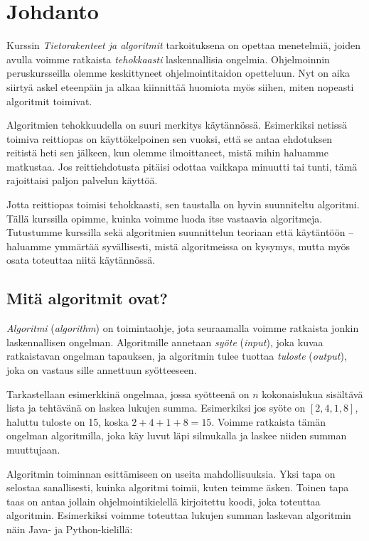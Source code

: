 \chapter{Johdanto}

Kurssin \emph{Tietorakenteet ja algoritmit} tarkoituksena
on opettaa menetelmiä, joiden avulla voimme ratkaista
\emph{tehokkaasti} laskennallisia ongelmia.
Ohjelmoinnin peruskursseilla olemme keskittyneet
ohjelmointitaidon opetteluun.
Nyt on aika siirtyä askel eteenpäin ja alkaa kiinnittää
huomiota myös siihen, miten nopeasti algoritmit toimivat.

Algoritmien tehokkuudella on suuri merkitys käytännössä.
Esimerkiksi netissä toimiva reittiopas on käyttökelpoinen sen vuoksi,
että se antaa ehdotuksen reitistä heti sen jälkeen, kun olemme
ilmoittaneet, mistä mihin haluamme matkustaa.
Jos reittiehdotusta pitäisi odottaa vaikkapa minuutti tai tunti,
tämä rajoittaisi paljon palvelun käyttöä.

Jotta reittiopas toimisi tehokkaasti, sen taustalla on
hyvin suunniteltu algoritmi.
Tällä kurssilla opimme, kuinka voimme luoda itse vastaavia algoritmeja.
Tutustumme kurssilla sekä algoritmien suunnittelun teoriaan että
käytäntöön -- haluamme ymmärtää syvällisesti, mistä algoritmeissa on kysymys,
mutta myös osata toteuttaa niitä käytännössä.

\section{Mitä algoritmit ovat?}


\emph{Algoritmi} (\emph{algorithm}) on toimintaohje, jota seuraamalla voimme ratkaista
jonkin laskennallisen ongelman.
Algoritmille annetaan \emph{syöte} (\emph{input}),
joka kuvaa ratkaistavan ongelman tapauksen,
ja algoritmin tulee tuottaa \emph{tuloste} (\emph{output}),
joka on vastaus sille annettuun syötteeseen.

Tarkastellaan esimerkkinä ongelmaa,
jossa syötteenä on $n$ kokonaislukua sisältävä lista ja
tehtävänä on laskea lukujen summa.
Esimerkiksi jos syöte on $[2,4,1,8]$,
haluttu tuloste on 15, koska $2+4+1+8=15$.
Voimme ratkaista tämän ongelman algoritmilla,
joka käy luvut läpi silmukalla ja laskee niiden
summan muuttujaan.

Algoritmin toiminnan esittämiseen on useita mahdollisuuksia.
Yksi tapa on selostaa sanallisesti, kuinka algoritmi toimii,
kuten teimme äsken.
Toinen tapa taas on antaa jollain ohjelmointikielellä
kirjoitettu koodi, joka toteuttaa algoritmin.
Esimerkiksi voimme toteuttaa lukujen summan laskevan
algoritmin näin Java- ja Python-kielillä:

